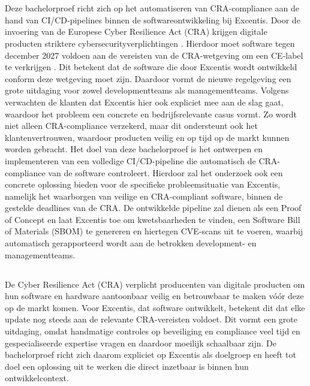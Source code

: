 
\chapter{}%
\label{ch:inleiding}

Deze bachelorproef richt zich op het automatiseren van CRA-compliance aan de hand van CI/CD-pipelines binnen de softwareontwikkeling bij Excentis. Door de invoering van de Europese Cyber Resilience Act (CRA) krijgen digitale producten striktere cybersecurityverplichtingen \parencite{EU_CRA}. Hierdoor moet software tegen december 2027 voldoen aan de vereisten van de CRA-wetgeving om een CE-label te verkrijgen \parencite{EuropeanCommission2024CRAnews}. Dit betekent dat de software die door Excentis wordt ontwikkeld conform deze wetgeving moet zijn. Daardoor vormt de nieuwe regelgeving een grote uitdaging voor zowel developmentteams als managementteams. Volgens \textcite{Robyn2025} verwachten de klanten dat Excentis hier ook expliciet mee aan de slag gaat, waardoor het probleem een concrete en bedrijfsrelevante casus vormt. Zo wordt niet alleen CRA-compliance verzekerd, maar dit ondersteunt ook het klantenvertrouwen, waardoor producten veilig en op tijd op de markt kunnen worden gebracht.
Het doel van deze bachelorproef is het ontwerpen en implementeren van een volledige CI/CD-pipeline die automatisch de CRA-compliance van de software controleert. Hierdoor zal het onderzoek ook een concrete oplossing bieden voor de specifieke probleemsituatie van Excentis, namelijk het waarborgen van veilige en CRA-compliant software, binnen de gestelde deadlines van de CRA. De ontwikkelde pipeline zal dienen als een Proof of Concept en laat Excentis toe om kwetsbaarheden te vinden, een Software Bill of Materials (SBOM) te genereren en hiertegen CVE-scans uit te voeren, waarbij automatisch gerapporteerd wordt aan de betrokken development- en managementteams. 

\section{}%
\label{sec:probleemstelling}

De Cyber Resilience Act (CRA) verplicht producenten van digitale producten om hun software en hardware aantoonbaar veilig en betrouwbaar te maken vóór deze op de markt komen. Voor Excentis, dat software ontwikkelt, betekent dit dat elke update nog steeds aan de relevante CRA-vereisten voldoet. Dit vormt een grote uitdaging, omdat handmatige controles op beveiliging en compliance veel tijd en gespecialiseerde expertise vragen en daardoor moeilijk schaalbaar zijn. De bachelorproef richt zich daarom expliciet op Excentis als doelgroep en heeft tot doel een oplossing uit te werken die direct inzetbaar is binnen hun ontwikkelcontext.
